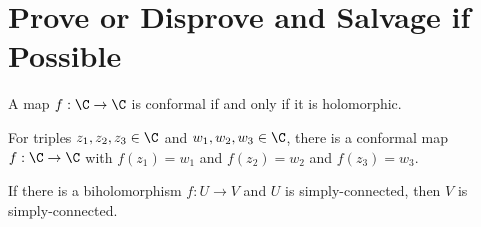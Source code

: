 \documentclass{homework}
\begin{document}
\section{Prove or Disprove and Salvage if Possible}

\begin{problem}
  A map $f : \C \to \C$ is conformal if and only if it is holomorphic.
\end{problem}

\begin{problem}
  For triples $z_1, z_2, z_3 \in \C$ and $w_1,w_2,w_3 \in \C$, there
  is a conformal map $f : \C \to \C$ with $f(z_1) = w_1$ and
  $f(z_2) = w_2$ and $f(z_3) = w_3$. %
\end{problem}

\begin{problem}
  If there is a biholomorphism $f : U \to V$ and $U$ is
  simply-connected, then $V$ is simply-connected.
\end{problem}
\end{document}
